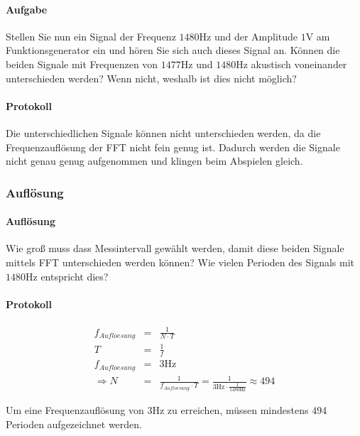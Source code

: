 \documentclass[10pt]{report}
\begin{document}
        \paragraph{Aufgabe}
        Stellen Sie nun ein Signal der Frequenz $1480\si{\hertz}$ und der Amplitude $1\si{\volt}$ am Funktionsgenerator
        ein und hören Sie sich auch dieses Signal an. Können die beiden
        Signale mit Frequenzen von $1477\si{\hertz}$ und $1480\si{\hertz}$ akustisch voneinander unterschieden
        werden? Wenn nicht, weshalb ist dies nicht möglich?
        \paragraph{Protokoll}

        Die unterschiedlichen Signale können nicht unterschieden werden, da die
        Frequenzauflösung der FFT nicht fein genug ist. Dadurch werden die Signale nicht genau
        genug aufgenommen und klingen beim Abspielen gleich.

        \subsubsection{Auflösung}
        \paragraph{Auflösung}
        Wie groß muss dass Messintervall gewählt werden, damit diese beiden Signale
        mittels FFT unterschieden werden können? Wie vielen Perioden des Signals mit
        $1480\si{\hertz}$ entspricht dies?
        \paragraph{Protokoll}

        \begin{eqnarray*}
            f_{Aufloesung} &=& \frac{1}{N \cdot T}\\
            T &=& \frac{1}{f}\\
            f_{Aufloesung} &=& 3 \si{\hertz}\\
            \Rightarrow N &=& \frac{1}{f_{Aufloesung} \cdot T} = \frac{1}{3 \si{\hertz} \cdot \frac{1}{1480\si{\hertz}}} \approx 494
        \end{eqnarray*}

        Um eine Frequenzauflösung von $3\si{\hertz}$ zu erreichen, müssen mindestens
        494 Perioden aufgezeichnet werden.
\end{document}
